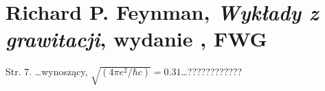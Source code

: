 \documentclass[a4paper,11pt]{article}
\numberwithin{equation}{section}
\begin{document}
\VerSpaceSix












\section{Richard P. Feynman,
  \textit{Wykłady z grawitacji},
  wydanie , FWG }

\vspace{0em}



\vspace{0em}


Str. 7. \ldots wynoszący,
$\sqrt{ ( 4 \pi e^{ 2 } / \hbar c) } = 0.31$\ldots ????????????


\VerSpaceSix














\printbibliography





\end{document}
